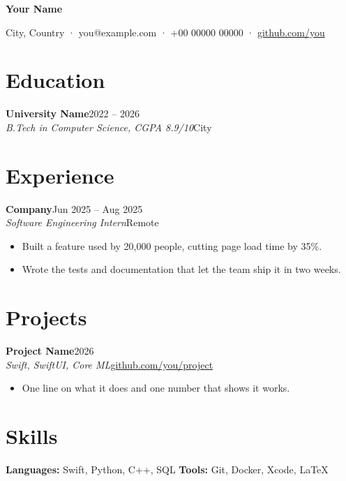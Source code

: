 \documentclass[10pt]{article}
\newcommand{\entry}[4]{%
  \textbf{#1}\hfill{\color{muted}#2}\\
  \textit{#3}\hfill{\color{muted}#4}\par\vspace{2pt}}
\begin{document}
{\Huge\bfseries Your Name}\par\vspace{4pt}
{\color{muted}City, Country \;·\; you@example.com \;·\; +00 00000 00000 \;·\; \href{https://github.com/you}{github.com/you}}

\section{Education}
\entry{University Name}{2022 -- 2026}{B.Tech in Computer Science, CGPA 8.9/10}{City}

\section{Experience}
\entry{Company}{Jun 2025 -- Aug 2025}{Software Engineering Intern}{Remote}
\begin{itemize}
  \item Built a feature used by 20,000 people, cutting page load time by 35\%.
  \item Wrote the tests and documentation that let the team ship it in two weeks.
\end{itemize}

\section{Projects}
\entry{Project Name}{2026}{Swift, SwiftUI, Core ML}{\href{https://github.com/you/project}{github.com/you/project}}
\begin{itemize}
  \item One line on what it does and one number that shows it works.
\end{itemize}

\section{Skills}
\textbf{Languages:} Swift, Python, C++, SQL \quad
\textbf{Tools:} Git, Docker, Xcode, \LaTeX
\end{document}
